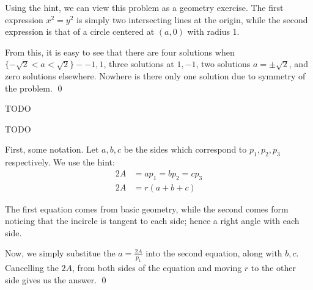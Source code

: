 \documentclass[11pt]{book} %
\begin{document}
\begin{Exercise}
	Using the hint, we can view this problem as a geometry exercise.
	The first expression $x^2 = y^2$ is simply two intersecting lines
	at the origin, while the second expression is that of a circle
	centered at $(a, 0)$ with radius 1. 

	From this, it is easy to see that there are four solutions when
	$\{-\sqrt{2} < a < \sqrt{2}\} - {-1, 1}$, three solutions at ${1,-1}$, two solutions $a=\pm\sqrt{2}$, and zero solutions elsewhere. Nowhere is there only one solution
	due to symmetry of the problem. \qed
\end{Exercise}

\begin{Exercise}
	TODO
\end{Exercise}

\begin{Exercise}
	TODO
\end{Exercise}

\begin{Exercise}
	First, some notation.
	Let $a,b,c$ be the sides which correspond to $p_1, p_2, p_3$ respectively. 
	We use the hint:
	\begin{align}
		2A &= ap_1 = bp_2 = cp_3 \\
		2A &= r(a + b + c)
	\end{align}

	The first equation comes from basic geometry, while the second comes form noticing that the incircle is tangent to each side; hence a right angle with each side.

	Now, we simply substitue the $a = \frac{2A}{p_1}$ into the second equation, along with $b, c$.
	Cancelling the $2A$, from both sides of the equation and moving $r$ to the other side gives us the answer. \qed
\end{Exercise}
\end{document}
